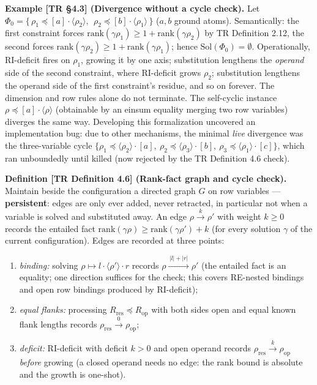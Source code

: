 \documentclass[
  10pt,
  letterpaper,
]{article}
\providecommand{\tightlist}{%
  \setlength{\itemsep}{0pt}\setlength{\parskip}{0pt}}
\begin{document}
\textbf{Example {[}TR §4.3{]} (Divergence without a cycle check).} Let
\(\Phi_0 = \{\, \rho_1 \preceq [a]\cdot\langle\rho_2\rangle,\ \ \rho_2 \preceq [b]\cdot\langle\rho_1\rangle \,\}\)
(\(a, b\) ground atoms). Semantically: the first constraint forces
\(\mathrm{rank}(\gamma\rho_1) \ge 1 + \mathrm{rank}(\gamma\rho_2)\) by
TR Definition 2.12, the second forces
\(\mathrm{rank}(\gamma\rho_2) \ge 1 + \mathrm{rank}(\gamma\rho_1)\);
hence \(\mathrm{Sol}(\Phi_0) = \emptyset\). Operationally, RI-deficit
fires on \(\rho_1\), growing it by one axis; substitution lengthens the
\emph{operand} side of the second constraint, where RI-deficit grows
\(\rho_2\); substitution lengthens the operand side of the first
constraint's residue, and so on forever. The dimension and row rules
alone do not terminate. The self-cyclic instance
\(\rho \preceq [a]\cdot\langle\rho\rangle\) (obtainable by an einsum
equality merging two row variables) diverges the same way. Developing
this formalization uncovered an implementation bug: due to other
mechanisms, the minimal \emph{live} divergence was the three-variable
cycle
\(\{\rho_1 \preceq \langle\rho_2\rangle{\cdot}[a],\ \rho_2 \preceq \langle\rho_3\rangle{\cdot}[b],\ \rho_3 \preceq \langle\rho_1\rangle{\cdot}[c]\}\),
which ran unboundedly until killed (now rejected by the TR Definition
4.6 check).

\textbf{Definition {[}TR Definition 4.6{]} (Rank-fact graph and cycle
check).} Maintain beside the configuration a directed graph \(G\) on row
variables --- \textbf{persistent}: edges are only ever added, never
retracted, in particular not when a variable is solved and substituted
away. An edge \(\rho \xrightarrow{\,k\,} \rho'\) with weight \(k \ge 0\)
records the entailed fact
\(\mathrm{rank}(\gamma\rho) \ge \mathrm{rank}(\gamma\rho') + k\) (for
every solution \(\gamma\) of the current configuration). Edges are
recorded at three points:

\begin{enumerate}
\def\labelenumi{(\roman{enumi})}
\tightlist
\item
  \emph{binding:} solving
  \(\rho \mapsto l \cdot \langle\rho'\rangle \cdot r\) records
  \(\rho \xrightarrow{\,|l|+|r|\,} \rho'\) (the entailed fact is an
  equality; one direction suffices for the check; this covers RE-nested
  bindings and open row bindings produced by RI-deficit);
\item
  \emph{equal flanks:} processing
  \(R_{\mathrm{res}} \preceq R_{\mathrm{op}}\) with both sides open and
  equal known flank lengths records
  \(\rho_{\mathrm{res}} \xrightarrow{\,0\,} \rho_{\mathrm{op}}\);
\item
  \emph{deficit:} RI-deficit with deficit \(k > 0\) and open operand
  records \(\rho_{\mathrm{res}} \xrightarrow{\,k\,} \rho_{\mathrm{op}}\)
  \emph{before} growing (a closed operand needs no edge: the rank bound
  is absolute and the growth is one-shot).
\end{enumerate}
\end{document}
